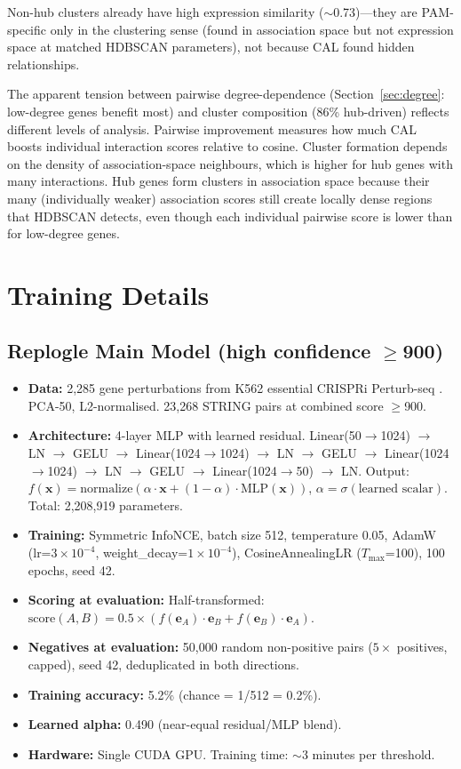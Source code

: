 \documentclass[11pt]{article}
\begin{document}
Non-hub clusters already have high expression similarity ($\sim$0.73)---they are PAM-specific only in the clustering sense (found in association space but not expression space at matched HDBSCAN parameters), not because CAL found hidden relationships.

The apparent tension between pairwise degree-dependence (Section~\ref{sec:degree}: low-degree genes benefit most) and cluster composition (86\% hub-driven) reflects different levels of analysis. Pairwise improvement measures how much CAL boosts individual interaction scores relative to cosine. Cluster formation depends on the density of association-space neighbours, which is higher for hub genes with many interactions. Hub genes form clusters in association space because their many (individually weaker) association scores still create locally dense regions that HDBSCAN detects, even though each individual pairwise score is lower than for low-degree genes.

\section{Training Details}
\label{app:training}

\subsection{Replogle Main Model (high confidence $\geq$900)}

\begin{itemize}
    \item \textbf{Data:} 2,285 gene perturbations from K562 essential CRISPRi Perturb-seq \citep{replogle2022mapping}. PCA-50, L2-normalised. 23,268 STRING pairs at combined score $\geq$900.
    \item \textbf{Architecture:} 4-layer MLP with learned residual. Linear(50$\to$1024) $\to$ LN $\to$ GELU $\to$ Linear(1024$\to$1024) $\to$ LN $\to$ GELU $\to$ Linear(1024$\to$1024) $\to$ LN $\to$ GELU $\to$ Linear(1024$\to$50) $\to$ LN. Output: $f(\mathbf{x}) = \text{normalize}(\alpha \cdot \mathbf{x} + (1-\alpha) \cdot \text{MLP}(\mathbf{x}))$, $\alpha = \sigma(\text{learned scalar})$. Total: 2,208,919 parameters.
    \item \textbf{Training:} Symmetric InfoNCE, batch size 512, temperature 0.05, AdamW (lr=$3 \times 10^{-4}$, weight\_decay=$1 \times 10^{-4}$), CosineAnnealingLR ($T_{\max}$=100), 100 epochs, seed 42.
    \item \textbf{Scoring at evaluation:} Half-transformed: $\text{score}(A,B) = 0.5 \times (f(\mathbf{e}_A) \cdot \mathbf{e}_B + f(\mathbf{e}_B) \cdot \mathbf{e}_A)$.
    \item \textbf{Negatives at evaluation:} 50,000 random non-positive pairs ($5\times$ positives, capped), seed 42, deduplicated in both directions.
    \item \textbf{Training accuracy:} 5.2\% (chance = 1/512 = 0.2\%).
    \item \textbf{Learned alpha:} 0.490 (near-equal residual/MLP blend).
    \item \textbf{Hardware:} Single CUDA GPU. Training time: $\sim$3 minutes per threshold.
\end{itemize}
\end{document}
